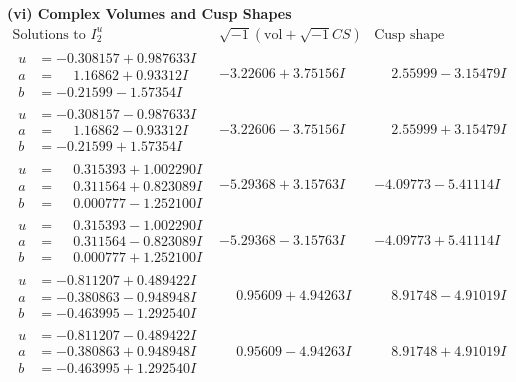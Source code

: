 \documentclass[1p]{elsarticle_modified}
\theoremstyle{definition}
\newcommand{\I}{\sqrt{-1}}
\begin{document}
\newpage\flushleft \textbf{(vi) Complex Volumes and Cusp Shapes}
$$\begin{array}{c|c|c}  
\text{Solutions to }I^u_{2}& \I (\text{vol} + \sqrt{-1}CS) & \text{Cusp shape}\\
 \hline 
\begin{aligned}
u &= -0.308157 + 0.987633 I \\
a &= \phantom{-}1.16862 + 0.93312 I \\
b &= -0.21599 - 1.57354 I\end{aligned}
 & -3.22606 + 3.75156 I & \phantom{-}2.55999 - 3.15479 I \\ \hline\begin{aligned}
u &= -0.308157 - 0.987633 I \\
a &= \phantom{-}1.16862 - 0.93312 I \\
b &= -0.21599 + 1.57354 I\end{aligned}
 & -3.22606 - 3.75156 I & \phantom{-}2.55999 + 3.15479 I \\ \hline\begin{aligned}
u &= \phantom{-}0.315393 + 1.002290 I \\
a &= \phantom{-}0.311564 + 0.823089 I \\
b &= \phantom{-}0.000777 - 1.252100 I\end{aligned}
 & -5.29368 + 3.15763 I & -4.09773 - 5.41114 I \\ \hline\begin{aligned}
u &= \phantom{-}0.315393 - 1.002290 I \\
a &= \phantom{-}0.311564 - 0.823089 I \\
b &= \phantom{-}0.000777 + 1.252100 I\end{aligned}
 & -5.29368 - 3.15763 I & -4.09773 + 5.41114 I \\ \hline\begin{aligned}
u &= -0.811207 + 0.489422 I \\
a &= -0.380863 - 0.948948 I \\
b &= -0.463995 - 1.292540 I\end{aligned}
 & \phantom{-}0.95609 + 4.94263 I & \phantom{-}8.91748 - 4.91019 I \\ \hline\begin{aligned}
u &= -0.811207 - 0.489422 I \\
a &= -0.380863 + 0.948948 I \\
b &= -0.463995 + 1.292540 I\end{aligned}
 & \phantom{-}0.95609 - 4.94263 I & \phantom{-}8.91748 + 4.91019 I \\ \hline\begin{aligned}

\end{aligned}
\end{array}$$
\end{document}
